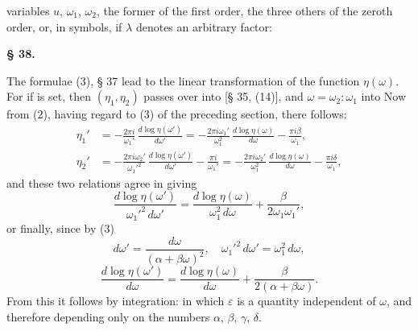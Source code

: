 
variables $u$, $\omega_1$, $\omega_2$, the former of the first order, the three others of the zeroth order, or, in symbols, if $\lambda$ denotes an arbitrary factor:

\begin{center}
\textbf{§ 38. }
\end{center}

The formulae (3), § 37 lead to the linear transformation of the function $\eta(\omega)$. For if
is set, then $(\eta_1, \eta_2)$ passes over into
[§ 35, (14)], and $\omega = \omega_2 : \omega_1$ into
Now from (2), having regard to (3) of the preceding section, there follows:
\[
\begin{aligned}
\eta_1' &= -\frac{2\pi i}{\omega_1'}\,\frac{d\log\eta(\omega')}{d\omega'} = -\frac{2\pi i \omega_1'}{\omega_1^2}\,\frac{d\log\eta(\omega)}{d\omega} - \frac{\pi i \beta}{\omega_1}, \\
\eta_2' &= -\frac{2\pi i \omega_2'}{{\omega_1'}^2}\,\frac{d\log\eta(\omega')}{d\omega'} - \frac{\pi i}{\omega_1'} = -\frac{2\pi i \omega_2'}{\omega_1^2}\,\frac{d\log\eta(\omega)}{d\omega} - \frac{\pi i \delta}{\omega_1},
\end{aligned}
\]
and these two relations agree in giving
\[
\frac{d\log\eta(\omega')}{{\omega_1'}^2\,d\omega'} = \frac{d\log\eta(\omega)}{\omega_1^2\,d\omega} + \frac{\beta}{2\omega_1\omega_1'},
\]
or finally, since by (3)
\[
d\omega' = \frac{d\omega}{(\alpha+\beta\omega)^2}, \quad {\omega_1'}^2\,d\omega' = \omega_1^2\,d\omega,
\]
\[
\frac{d\log\eta(\omega')}{d\omega} = \frac{d\log\eta(\omega)}{d\omega} + \frac{\beta}{2(\alpha+\beta\omega)}.
\]
From this it follows by integration:
in which $\varepsilon$ is a quantity independent of $\omega$, and therefore depending only on the numbers $\alpha$, $\beta$, $\gamma$, $\delta$.
